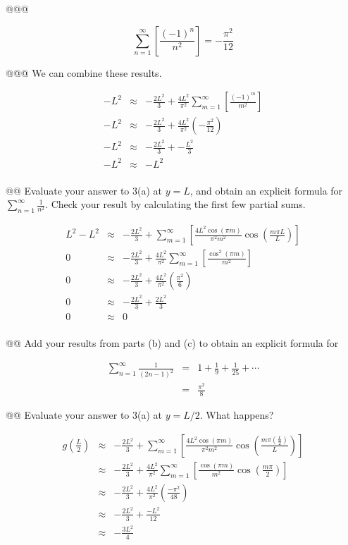 \documentclass[10pt]{article}
\begin{document}
\begin{easylist}[enumerate]
    @@@

    \[
        \sum_{n=1}^\infty \left[ \frac{{(-1)}^{n}}{n^2} \right] = -\frac{\pi^2}{12}
    \]

    @@@ We can combine these results.

    \begin{align*}
        -L^2 &\approx& -\frac{2 L^2}{3} + \frac{4L^2}{\pi^2} \sum_{m=1}^\infty \left[ \frac{{(-1)}^m}{m^2} \right]\\
        -L^2 &\approx& -\frac{2 L^2}{3} + \frac{4L^2}{\pi^2} \left( -\frac{\pi^2}{12} \right)\\
        -L^2 &\approx& -\frac{2 L^2}{3} + -\frac{L^2}{3}\\
        -L^2 &\approx& -L^2\\
    \end{align*}

    @@ Evaluate your answer to 3(a) at $y=L$, and obtain an explicit formula for $\sum_{n=1}^\infty \frac{1}{n^2}$.
    Check your result by calculating the first few partial sums.

    \begin{align*}
        L^2 - L^2 &\approx& -\frac{2 L^2}{3} + \sum_{m=1}^\infty \left[ \frac{4 L^2 \cos (\pi  m)}{\pi^2 m^2} \cos \left( \frac{m \pi L}{L} \right) \right]\\
        0 &\approx& -\frac{2 L^2}{3} + \frac{4L^2}{\pi^2} \sum_{m=1}^\infty \left[ \frac{\cos^2(\pi  m)}{m^2} \right]\\
        0 &\approx& -\frac{2 L^2}{3} + \frac{4L^2}{\pi^2} \left( \frac{\pi^2}{6} \right)\\
        0 &\approx& -\frac{2 L^2}{3} + \frac{2L^2}{3}\\
        0 &\approx& 0\\
    \end{align*}

    @@ Add your results from parts (b) and (c) to obtain an explicit formula for

    \begin{align*}
        \sum_{n=1}^\infty \frac{1}{{(2n - 1)}^2} &=& 1 + \frac{1}{9} + \frac{1}{25} + \cdots\\
        &=& \frac{\pi^2}{8}
    \end{align*}

    @@ Evaluate your answer to 3(a) at $y = L / 2$. What happens?

    \begin{align*}
        g\left(\frac{L}{2}\right) &\approx& -\frac{2 L^2}{3} + \sum_{m=1}^\infty \left[ \frac{4 L^2 \cos (\pi  m)}{\pi^2 m^2} \cos \left( \frac{m \pi {\left(\frac{L}{2}\right)}}{L} \right) \right]\\
        &\approx& -\frac{2 L^2}{3} + \frac{4L^2}{\pi^2} \sum_{m=1}^\infty \left[ \frac{\cos (\pi  m)}{m^2} \cos \left( \frac{m \pi}{2} \right) \right]\\
        &\approx& -\frac{2 L^2}{3} + \frac{4L^2}{\pi^2} \left( \frac{-\pi^2}{48} \right)\\
        &\approx& -\frac{2 L^2}{3} + \frac{-L^2}{12}\\
        &\approx& -\frac{3 L^2}{4}\\
    \end{align*}


\end{easylist}
\end{document}
